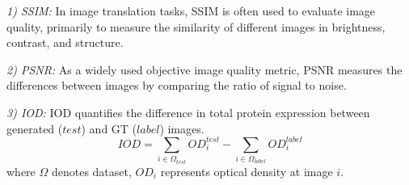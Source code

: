 \documentclass[journal,twoside,web]{ieeecolor}
\begin{document}



\textit{1) SSIM:}
In image translation tasks, SSIM is often used to evaluate image quality, primarily to measure the similarity of different images in brightness, contrast, and structure. 




\textit{2) PSNR:}
As a widely used objective image quality metric, PSNR measures the differences between images by comparing the ratio of signal to noise.





\textit{3) IOD:} IOD quantifies the difference in total protein expression between generated ($test$) and GT ($label$) images.
\begin{equation}
IOD = \sum_{i \in \Omega_{test}} OD_i^{test} - \sum_{i \in \Omega_{label}} OD_i^{label}
\end{equation}
where $\Omega$ denotes dataset, $OD_i$ represents optical density at image $i$. 
\end{document}

